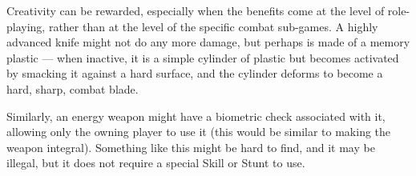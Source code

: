 Creativity can be rewarded, especially when the benefits come at the level of role-playing, rather than at the level of the specific combat sub-games. A highly advanced knife might not do any more damage, but perhaps is made of a memory plastic --- when inactive, it is a simple cylinder of plastic but becomes activated by smacking it against a hard surface, and the cylinder deforms to become a hard, sharp, combat blade.

Similarly, an energy weapon might have a biometric check associated with it, allowing only the owning player to use it (this would be similar to making the weapon integral). Something like this might be hard to find, and it may be illegal, but it does not require a special Skill or Stunt to use.


